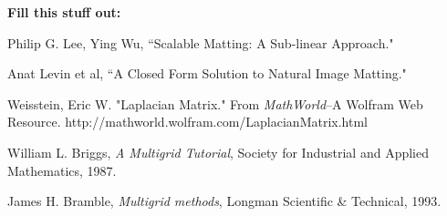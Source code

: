 \textbf{Fill this stuff out:}

\begin{thebibliography}{9}
	Philip G. Lee, Ying Wu,
	``Scalable Matting: A Sub-linear Approach."
	
	Anat Levin et al,
	``A Closed Form Solution to Natural Image Matting."
	
	 Weisstein, Eric W. "Laplacian Matrix." From 	\textit{MathWorld}--A Wolfram Web Resource. http://mathworld.wolfram.com/LaplacianMatrix.html 
	 
	William L. Briggs, \textit{A Multigrid Tutorial},
	Society for Industrial and Applied Mathematics, 1987.
	
	James H. Bramble, \textit{Multigrid methods},
	Longman Scientific \& Technical, 1993.

\end{thebibliography}